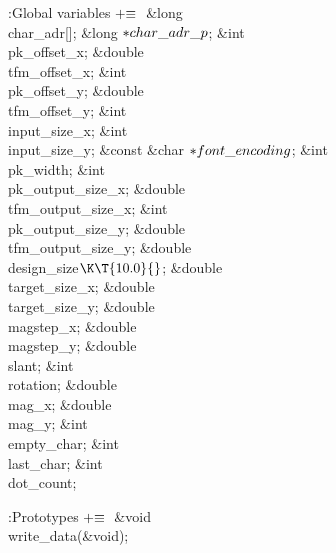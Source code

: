 \Y\B\4:Global variables\X${}\mathrel+\equiv{}$\6
\&{long} \\{char\_adr}[];\6
\&{long} ${}{*}\\{char\_adr\_p}{}$;\7
\&{int} \\{pk\_offset\_x};\6
\&{double} \\{tfm\_offset\_x};\6
\&{int} \\{pk\_offset\_y};\6
\&{double} \\{tfm\_offset\_y};\7
\&{int} \\{input\_size\_x};\6
\&{int} \\{input\_size\_y};\6
\&{const} \&{char} ${}{*}\\{font\_encoding}{}$;\6
\&{int} \\{pk\_width};\6
\&{int} \\{pk\_output\_size\_x};\6
\&{double} \\{tfm\_output\_size\_x};\6
\&{int} \\{pk\_output\_size\_y};\6
\&{double} \\{tfm\_output\_size\_y};\7
\&{double} \\{design\_size}${}\K\T{10.0}{}$;\6
\&{double} \\{target\_size\_x};\6
\&{double} \\{target\_size\_y};\6
\&{double} \\{magstep\_x};\6
\&{double} \\{magstep\_y};\6
\&{double} \\{slant};\6
\&{int} \\{rotation};\7
\&{double} \\{mag\_x};\6
\&{double} \\{mag\_y};\7
\&{int} \\{empty\_char};\6
\&{int} \\{last\_char};\7
\&{int} \\{dot\_count};\par
\fi

\Y\B\4:Prototypes\X${}\mathrel+\equiv{}$\6
\&{void} \\{write\_data}(\&{void});\par
\fi

